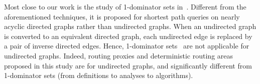  Most close to our work is the study of 1-dominator sets in~\cite{SaundersT07}. Different from the aforementioned techniques, it is proposed for shortest path queries on nearly acyclic directed graphs rather than undirected graphs. When an undirected graph is converted to an equivalent directed graph, each undirected edge is replaced by a pair of inverse directed edges. Hence, 1-dominator sets~\cite{SaundersT07} are not applicable for undirected graphs. Indeed, routing proxies and deterministic routing areas proposed in this study  are for undirected graphs,  and  significantly different from 1-dominator sets (from definitions to analyses to algorithms).








